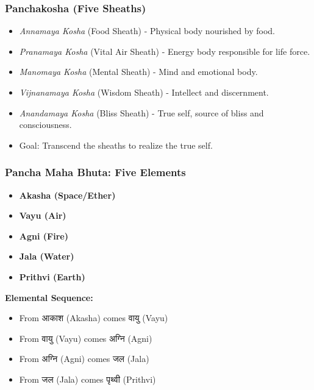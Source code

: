 \begin{frame}[fragile]\frametitle{Panchakosha (Five Sheaths)}

      \begin{itemize}
		\item \textit{Annamaya Kosha} (Food Sheath) - Physical body nourished by food.
		\item \textit{Pranamaya Kosha} (Vital Air Sheath) - Energy body responsible for life force.
		\item \textit{Manomaya Kosha} (Mental Sheath) - Mind and emotional body.
		\item \textit{Vijnanamaya Kosha} (Wisdom Sheath) - Intellect and discernment.
		\item \textit{Anandamaya Kosha} (Bliss Sheath) - True self, source of bliss and consciousness.
		\item Goal: Transcend the sheaths to realize the true self.
	  \end{itemize}

\end{frame}

\begin{frame}[fragile]\frametitle{Pancha Maha Bhuta: Five Elements}
    \begin{itemize}
        \item \textbf{Akasha (Space/Ether)}
        \item \textbf{Vayu (Air)}
        \item \textbf{Agni (Fire)}
        \item \textbf{Jala (Water)}
        \item \textbf{Prithvi (Earth)}
    \end{itemize}
    \textbf{Elemental Sequence:}
    \begin{itemize}
        \item From आकाश (Akasha) comes वायु (Vayu)
        \item From वायु (Vayu) comes अग्नि (Agni)
        \item From अग्नि (Agni) comes जल (Jala)
        \item From जल (Jala) comes पृथ्वी (Prithvi)
    \end{itemize}
\end{frame}

